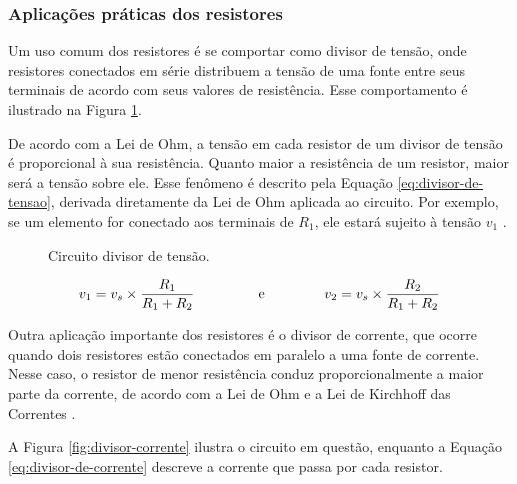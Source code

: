 \documentclass[12pt]{article}
\begin{document}
    \subsubsection{Aplicações práticas dos resistores}
    Um uso comum dos resistores é se comportar como divisor de tensão, onde resistores conectados em série distribuem a tensão de uma fonte entre seus terminais de acordo com seus valores de resistência. Esse comportamento é ilustrado na Figura \ref{fig:divisor-tensao}.

    De acordo com a Lei de Ohm, a tensão em cada resistor de um divisor de tensão é proporcional à sua resistência. Quanto maior a resistência de um resistor, maior será a tensão sobre ele. Esse fenômeno é descrito pela Equação \ref{eq:divisor-de-tensao}, derivada diretamente da Lei de Ohm aplicada ao circuito. Por exemplo, se um elemento for conectado aos terminais de \(R_1\), ele estará sujeito à tensão \(v_1\) \parencite[][, p. 65]{nilsson}. 
    
    \begin{figure}[H]
        \centering
        \caption{Circuito divisor de tensão.}
        \label{fig:divisor-tensao}
    \end{figure}

    \begin{equation}
        v_1=v_s\times\frac{R_1}{R_1+R_2} \text{\hspace{1.5cm} e\hspace{1.5cm}} v_2=v_s\times\frac{R_2}{R_1+R_2}
        \label{eq:divisor-de-tensao}
    \end{equation}
    
    Outra aplicação importante dos resistores é o divisor de corrente, que ocorre quando dois resistores estão conectados em paralelo a uma fonte de corrente. Nesse caso, o resistor de menor resistência conduz proporcionalmente a maior parte da corrente, de acordo com a Lei de Ohm e a Lei de Kirchhoff das Correntes \parencite[][, p. 66]{nilsson}.
    
    A Figura \ref{fig:divisor-corrente} ilustra o circuito em questão, enquanto a Equação \ref{eq:divisor-de-corrente} descreve a corrente que passa por cada resistor.
\end{document}
